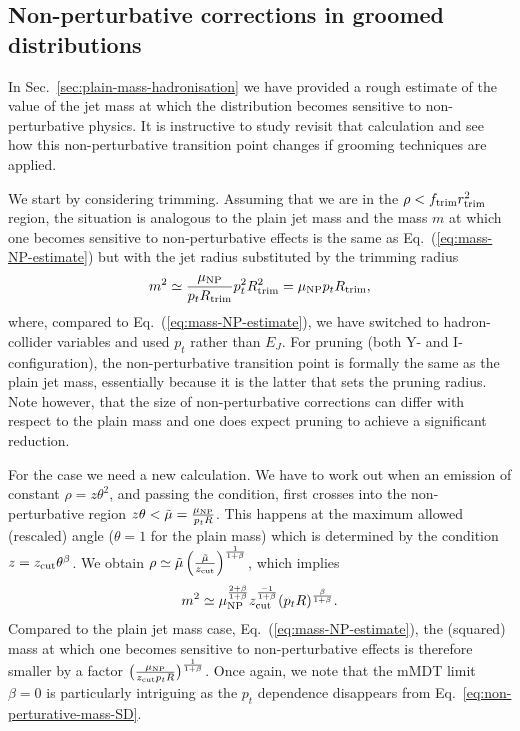  
\subsection{Non-perturbative corrections in groomed distributions}\label{sec:groomed-mass-hadronisation}

In Sec.~\ref{sec:plain-mass-hadronisation} we have provided a rough
estimate of the value of the jet mass at which the distribution
becomes sensitive to non-perturbative physics.
%
It is instructive to study revisit that calculation and see how this non-perturbative transition point changes if grooming techniques are applied. 

We start by considering trimming. Assuming that we are in the
$\rho < f_{\text{trim}} r_{\text{trim}}^2$ region, the situation is analogous to the
plain jet mass and the mass $m$ at which one becomes sensitive to
non-perturbative effects is the same as
Eq.~(\ref{eq:mass-NP-estimate}) but with the jet radius substituted by
the trimming radius
\begin{equation}\label{eq:mass-NP-estimate-trimming}
m^2\simeq \frac{\mu_\text{NP}}{p_t R_{\text{trim}}} p_t^2 R_{\text{trim}}^2= \mu_\text{NP} p_t R_{\text{trim}},
\end{equation}
where, compared to Eq.~(\ref{eq:mass-NP-estimate}), we have switched
to hadron-collider variables and used $p_t$ rather than $E_J$.
%
For pruning (both Y- and I-configuration), the non-perturbative
transition point is formally the same as the plain jet mass,
essentially because it is the latter that sets the pruning
radius. Note however, that the size of non-perturbative corrections
can differ with respect to the plain mass and one does expect pruning
to achieve a significant reduction.

For the \SD case we need a new calculation. We have to work out when
an emission of constant $\rho = z \theta^2$, and passing the \SD
condition, first crosses into the non-perturbative region
$ z \theta< \tilde{\mu}=\frac{\mu_\text{NP}}{p_tR}$.
%
This happens at the maximum allowed (rescaled) angle ($\theta=1$ for
the plain mass) which is determined by the \SD condition
$z=z_{\text{cut}} \theta^\beta$. We obtain
$\rho\simeq \tilde{\mu} \left(\tfrac{\tilde{\mu}}{z_{\text{cut}}}
\right)^\frac{1}{1+\beta}$, which implies
\begin{equation}\label{eq:non-perturative-mass-SD}
m^2\simeq \mu_\text{NP}^\frac{2 +\beta}{1+\beta} z_{\text{cut}}^\frac{-1}{1+\beta}(p_t R)^\frac{\beta}{1+\beta}.
\end{equation}
Compared to the plain jet mass case,
Eq.~(\ref{eq:mass-NP-estimate}), the (squared) mass at which
one becomes sensitive to non-perturbative effects is therefore smaller
by a factor $\big(\tfrac{\mu_\text{NP}}{z_{\text{cut}} p_tR}\big)^{\frac{1}{1+\beta}}$.
%
Once again, we note that the mMDT limit $\beta=0$ is particularly
intriguing as the $p_t$ dependence disappears from
Eq.~\eqref{eq:non-perturative-mass-SD}.


